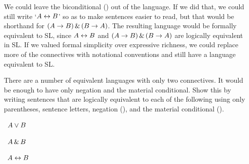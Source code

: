 \problempart
\label{pr.altConnectives}
We could leave the biconditional (\eiff) out of the language. If we did that, we could still write `$A\leftrightarrow B$' so as to make sentences easier to read, but that would be shorthand for $(A\rightarrow B) \,\&\, (B\rightarrow A)$. The resulting language would be formally equivalent to SL, since $A\leftrightarrow B$ and $(A\rightarrow B) \,\&\, (B\rightarrow A)$ are logically equivalent in SL. If we valued formal simplicity over expressive richness, we could replace more of the connectives with notational conventions and still have a language equivalent to SL. 

There are a number of equivalent languages with only two connectives. It would be enough to have only negation and the material conditional. Show this by writing sentences that are logically equivalent to each of the following using only parentheses, sentence letters, negation (\enot), and the material conditional (\eif).
\begin{earg}
\item\leftsolutions\ $A\vee B$
\item\leftsolutions\ $A\,\&\, B$
\item\leftsolutions\ $A\leftrightarrow B$
\end{earg}

